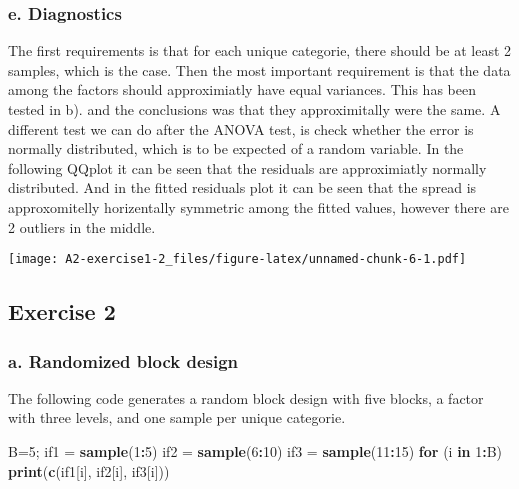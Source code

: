 \documentclass[]{article}
\newenvironment{Shaded}{\begin{snugshade}}{\end{snugshade}}
\newcommand{\ControlFlowTok}[1]{\textcolor[rgb]{0.13,0.29,0.53}{\textbf{#1}}}
\newcommand{\DecValTok}[1]{\textcolor[rgb]{0.00,0.00,0.81}{#1}}
\newcommand{\KeywordTok}[1]{\textcolor[rgb]{0.13,0.29,0.53}{\textbf{#1}}}
\newcommand{\NormalTok}[1]{#1}
\newcommand{\OperatorTok}[1]{\textcolor[rgb]{0.81,0.36,0.00}{\textbf{#1}}}
\newcommand{\StringTok}[1]{\textcolor[rgb]{0.31,0.60,0.02}{#1}}
\begin{document}
\hypertarget{e.-diagnostics}{%
\subsubsection{e. Diagnostics}\label{e.-diagnostics}}

The first requirements is that for each unique categorie, there should
be at least 2 samples, which is the case. Then the most important
requirement is that the data among the factors should approximiatly have
equal variances. This has been tested in b). and the conclusions was
that they approximitally were the same. A different test we can do after
the ANOVA test, is check whether the error is normally distributed,
which is to be expected of a random variable. In the following QQplot it
can be seen that the residuals are approximiatly normally distributed.
And in the fitted residuals plot it can be seen that the spread is
approxomitelly horizentally symmetric among the fitted values, however
there are 2 outliers in the middle.

\texttt{[image: A2-exercise1-2\_files/figure-latex/unnamed-chunk-6-1.pdf]}

\hypertarget{exercise-2}{%
\subsection{Exercise 2}\label{exercise-2}}

\hypertarget{a.-randomized-block-design}{%
\subsubsection{a. Randomized block
design}\label{a.-randomized-block-design}}

The following code generates a random block design with five blocks, a
factor with three levels, and one sample per unique categorie.

\begin{Shaded}
\begin{Highlighting}[]
\NormalTok{B=}\DecValTok{5}\NormalTok{;}
\NormalTok{if1 =}\StringTok{ }\KeywordTok{sample}\NormalTok{(}\DecValTok{1}\OperatorTok{:}\DecValTok{5}\NormalTok{)}
\NormalTok{if2 =}\StringTok{ }\KeywordTok{sample}\NormalTok{(}\DecValTok{6}\OperatorTok{:}\DecValTok{10}\NormalTok{)}
\NormalTok{if3 =}\StringTok{ }\KeywordTok{sample}\NormalTok{(}\DecValTok{11}\OperatorTok{:}\DecValTok{15}\NormalTok{)}
\ControlFlowTok{for}\NormalTok{ (i }\ControlFlowTok{in} \DecValTok{1}\OperatorTok{:}\NormalTok{B) }\KeywordTok{print}\NormalTok{(}\KeywordTok{c}\NormalTok{(if1[i], if2[i], if3[i]))}
\end{Highlighting}
\end{Shaded}
\end{document}
